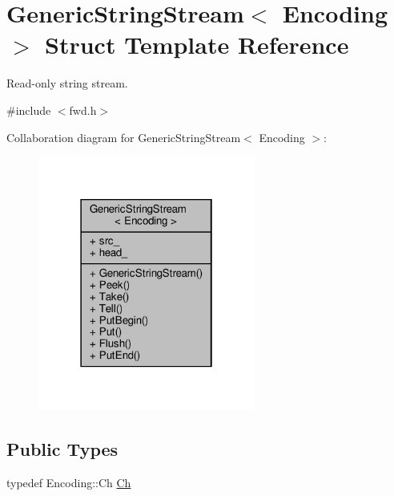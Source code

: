\hypertarget{structGenericStringStream}{}\section{Generic\+String\+Stream$<$ Encoding $>$ Struct Template Reference}
\label{structGenericStringStream}


Read-\/only string stream.  




{\ttfamily \#include $<$fwd.\+h$>$}



Collaboration diagram for Generic\+String\+Stream$<$ Encoding $>$\+:
\nopagebreak
\begin{figure}[H]
\begin{center}
\leavevmode
\includegraphics[width=202pt]{structGenericStringStream__coll__graph}
\end{center}
\end{figure}
\subsection*{Public Types}
\begin{DoxyCompactItemize}
\item 
typedef Encoding\+::\+Ch \hyperlink{structGenericStringStream_a4289aca895330084ff3168e37e4f08bd}{Ch}
\end{DoxyCompactItemize}
